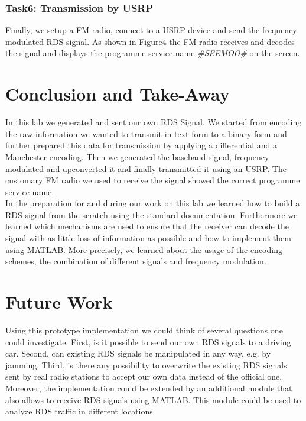 \documentclass[sigconf]{acmart}
\begin{document}
\hypertarget{Task6:ux20Transmission by USRPux20}{%
\subsubsection{Task6: Transmission by USRP}
\label{Task6:ux20Transmission by USRPux20}}
Finally, we setup a FM radio, connect to a USRP device and send the frequency modulated RDS signal.
As shown in Figure4 the FM radio receives and decodes the signal and displays the programme service
name \textit{\#SEEMOO\#} on the screen.

\section{Conclusion and Take-Away}
In this lab we generated and sent our own RDS Signal. We started from encoding the raw information
we wanted to transmit in text form to a binary form and further prepared this data for transmission by
applying a differential and a Manchester encoding. Then we generated the baseband signal, frequency
modulated and upconverted it and finally transmitted it using an USRP. The customary FM radio we used
to receive the signal showed the correct programme service name.\\
In the preparation for and during our work on this lab we learned how to build a RDS signal from the scratch
using the standard documentation. Furthermore we learned which mechanisms are used to ensure that
the receiver can decode the signal with as little loss of information as possible and how to implement them
using MATLAB. More precisely, we learned about the usage of the encoding schemes, the combination of
different signals and frequency modulation.

\section{Future Work}
Using this prototype implementation we could think of several questions one could investigate. First, is it
possible to send our own RDS signals to a driving car. Second, can existing RDS signals be manipulated
in any way, e.g. by jamming. Third, is there any possibility to overwrite the existing RDS signals sent by
real radio stations to accept our own data instead of the official one.
Moreover, the implementation could be extended by an additional module that also allows to receive
RDS signals using MATLAB. This module could be used to analyze RDS traffic in different locations.




 
\end{document}
